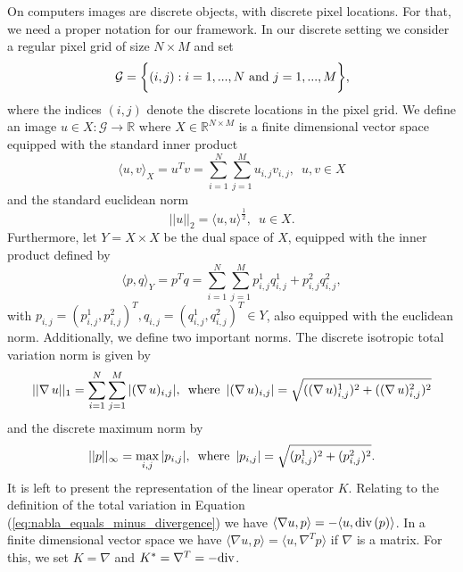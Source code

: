 \documentclass[abstracton]{scrreprt}
\begin{document}
        On computers images are discrete objects, with discrete pixel locations. For that, we need a proper notation for our framework. In our discrete setting we consider a regular pixel grid of size $N \times M$ and set
            \begin{equation}
                \mathcal{G} = \bigg\{ (i, j) : i = 1, ..., N \,\, \textnormal{and} \,\, j = 1, ..., M \bigg\},
                \label{eq:pixel_grid}
            \end{equation}
        where the indices $(i, j)$ denote the discrete locations in the pixel grid. We define an image $u \in X: \mathcal{G} \longrightarrow \mathbb{R}$ where $X \in \mathbb{R}^{N \times M}$ is a finite dimensional vector space equipped with the standard inner product
            \begin{equation}
                \langle u, v \rangle_{X} = u^{T}v = \sum_{i = 1}^{N} \sum_{j = 1}^{M} u_{i, j} v_{i, j}, \,\,\, u, v \in X
                \label{eq:inner_product}
            \end{equation}
        and the standard euclidean norm
            $$
                ||u||_{2} = \langle u, u \rangle^{\frac{1}{2}}, \,\,\, u \in X.
            $$
        Furthermore, let $Y = X \times X$ be the dual space of $X$, equipped with the inner product defined by
            \begin{equation}
                \langle p, q \rangle_{Y} = p^{T}q = \sum_{i = 1}^{N} \sum_{j = 1}^{M} p^{1}_{i, j} q^{1}_{i, j} + p^{2}_{i, j} q^{2}_{i, j},
                \label{eq:inner_product_space_y}
            \end{equation}
        with $p_{i, j} = \left(p^{1}_{i, j}, p^{2}_{i, j}\right)^{T}, q_{i, j} = \left(q^{1}_{i, j}, q^{2}_{i, j}\right)^{T} \in Y$, also equipped with the euclidean norm. Additionally, we define two important norms. The discrete isotropic total variation norm is given by
            $$
                ||\nabla \, u||_{1} = \sum_{i = 1}^{N} \sum_{j = 1}^{M} |(\nabla \, u)_{i, j}|, \,\,\, \textnormal{where} \,\,\, |(\nabla \, u)_{i, j}| = \sqrt{((\nabla \, u)^{1}_{i, j})^{2} + ((\nabla \, u)^{2}_{i, j})^{2}}
            $$
        and the discrete maximum norm by
            $$
                ||p||_{\infty} = \max_{i, j} |p_{i, j}|, \,\,\, \textnormal{where} \,\,\, |p_{i, j}| = \sqrt{(p^{1}_{i, j})^{2} + (p^{2}_{i, j})^{2}}.
            $$
        It is left to present the representation of the linear operator $K$. Relating to the definition of the total variation in Equation (\ref{eq:nabla_equals_minus_divergence}) we have $\langle \nabla u, p \rangle = - \langle u, \textnormal{div}\,(p) \rangle$. In a finite dimensional vector space we have $\langle \nabla u, p \rangle = \langle u, \nabla^{T} p \rangle$ if $\nabla$ is a matrix. For this, we set $K = \nabla$ and $K^{\ast} = \nabla^{T} = -\textnormal{div}$.
\end{document}

